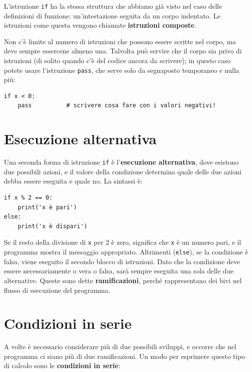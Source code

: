 \documentclass[10pt]{book}
\begin{document}
L'istruzione {\tt if} ha la stessa struttura che abbiamo già visto nel caso delle definizioni di funzione: un'intestazione seguita da un corpo indentato. Le istruzioni come questa vengono chiamate {\bf istruzioni composte}.

Non c'è limite al numero di istruzioni che possono essere scritte nel corpo, ma deve sempre essercene almeno una. Talvolta può servire che il corpo sia privo di istruzioni (di solito quando c'è del codice ancora da scrivere); in questo caso potete usare l'istruzione {\tt pass}, che serve solo da segnaposto temporaneo e nulla più:

\begin{verbatim}
if x < 0:
    pass          # scrivere cosa fare con i valori negativi!
\end{verbatim}
%

\section{Esecuzione alternativa}
\label{alternative.execution}

Una seconda forma di istruzione {\tt if} è l'{\bf esecuzione alternativa},
dove esistono due possibili azioni, e il valore della condizione determina quale delle due azioni debba essere eseguita e quale no. La sintassi è:

\begin{verbatim}
if x % 2 == 0:
    print('x è pari')
else:
    print('x è dispari')
\end{verbatim}
%
Se il resto della divisione di {\tt x} per 2 è zero, significa che {\tt x} è un numero pari, e il programma mostra il messaggio appropriato. Altrimenti (\verb"else"), se la condizione è falsa, viene eseguito il secondo blocco di istruzioni. Dato che la condizione deve essere necessariamente o vera o falsa, sarà sempre eseguita una sola delle due alternative. Queste sono dette {\bf ramificazioni}, perché rappresentano dei bivi nel flusso di esecuzione del programma.


\section{Condizioni in serie}

A volte è necessario considerare più di due possibili sviluppi, e occorre che nel programma ci siano più di due ramificazioni. Un modo per esprimere questo tipo di calcolo sono le {\bf condizioni in serie}:
\end{document}
